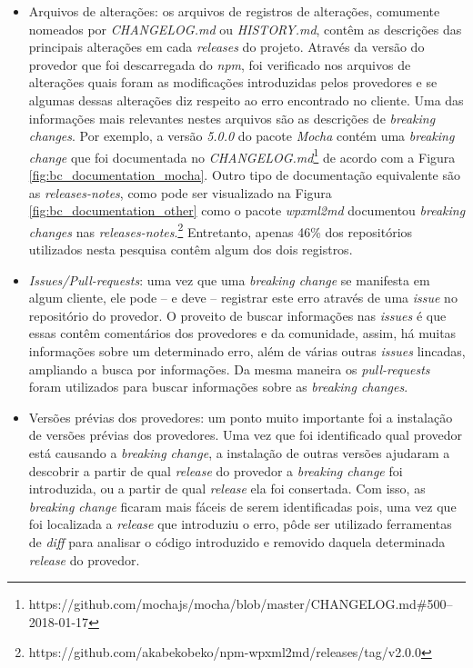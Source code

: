 \begin{itemize}
    \item Arquivos de alterações: os arquivos de registros de alterações, comumente nomeados por \textit{CHANGELOG.md} ou \textit{HISTORY.md}, contêm as descrições das principais alterações em cada \textit{releases} do projeto. Através da versão do provedor que foi descarregada do \textit{npm}, foi verificado nos arquivos de alterações quais foram as modificações introduzidas pelos provedores e se algumas dessas alterações diz respeito ao erro encontrado no cliente. Uma das informações mais relevantes nestes arquivos são as descrições de \textit{breaking changes}. Por exemplo, a versão \textit{5.0.0} do pacote \textit{Mocha} contém uma \textit{breaking change} que foi documentada no \textit{CHANGELOG.md}\footnote{https://github.com/mochajs/mocha/blob/master/CHANGELOG.md\#500--2018-01-17} de acordo com a Figura \ref{fig:bc_documentation_mocha}. Outro tipo de documentação equivalente são as \textit{releases-notes}, como pode ser visualizado na Figura \ref{fig:bc_documentation_other} como o pacote \textit{wpxml2md} documentou \textit{breaking changes} nas \textit{releases-notes}.\footnote{https://github.com/akabekobeko/npm-wpxml2md/releases/tag/v2.0.0} Entretanto, apenas 46\% dos repositórios utilizados nesta pesquisa contêm algum dos dois registros.

    \item \textit{Issues/Pull-requests}: uma vez que uma \textit{breaking change} se manifesta em algum cliente, ele pode -- e deve -- registrar este erro através de uma \textit{issue} no repositório do provedor. O proveito de buscar informações nas \textit{issues} é que essas contêm comentários dos provedores e da comunidade, assim, há muitas informações sobre um determinado erro, além de várias outras \textit{issues} lincadas, ampliando a busca por informações. Da mesma maneira os \textit{pull-requests} foram utilizados para buscar informações sobre as \textit{breaking changes}.

    \item Versões prévias dos provedores: um ponto muito importante foi a instalação de versões prévias dos provedores. Uma vez que foi identificado qual provedor está causando a \textit{breaking change}, a instalação de outras versões ajudaram a descobrir a partir de qual \textit{release} do provedor a \textit{breaking change} foi introduzida, ou a partir de qual \textit{release} ela foi consertada. Com isso, as \textit{breaking change} ficaram mais fáceis de serem identificadas pois, uma vez que foi localizada a \textit{release} que introduziu o erro, pôde ser utilizado ferramentas de \textit{diff} para analisar o código introduzido e removido daquela determinada \textit{release} do provedor.


\end{itemize}
